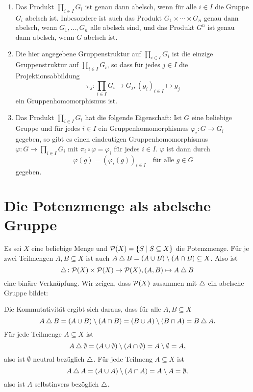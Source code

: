 \begin{bem}
 \begin{enumerate}[leftmargin=*]
  \item
   Das Produkt $\prod_{i \in I} G_i$ ist genau dann abelsch, wenn für alle $i \in I$ die Gruppe $G_i$ abelsch ist. Inbesondere ist auch das Produkt $G_1 \times \dotsb \times G_n$ genau dann abelsch, wenn $G_1, \dotsc, G_n$ alle abelsch sind, und das Produkt $G^n$ ist genau dann abelsch, wenn $G$ abelsch ist.
  \item
   Die hier angegebene Gruppenstruktur auf $\prod_{i \in I} G_i$ ist die einzige Gruppenstruktur auf $\prod_{i \in I} G_i$, so dass für jedes $j \in I$ die Projektionsabbildung
   \[
    \pi_j \colon \prod_{i \in I} G_i \to G_j, (g_i)_{i \in I} \mapsto g_j
   \]
   ein Gruppenhomomorphismus ist.
  \item
   Das Produkt $\prod_{i \in I} G_i$ hat die folgende Eigenschaft: Ist $G$ eine beliebige Gruppe und für jedes $i \in I$ ein Gruppenhomomorphismus $\varphi_i \colon G \to G_i$ gegeben, so gibt es einen eindeutigen Gruppenhomomorphismus $\varphi \colon G \to \prod_{i \in I} G_i$ mit $\pi_i \circ \varphi = \varphi_i$ für jedes $i \in I$. $\varphi$ ist dann durch
   \[
    \varphi(g) = (\varphi_i(g))_{i \in I}
    \quad
    \text{für alle $g \in G$}
   \]
   gegeben.
 \end{enumerate}
\end{bem}





\section{Die Potenzmenge als abelsche Gruppe}
Es sei $X$ eine beliebige Menge und $\mathcal{P}(X) = \{S \mid S \subseteq X\}$ die Potenzmenge. Für je zwei Teilmengen $A, B \subseteq X$ ist auch $A \bigtriangleup B = (A \cup B) \setminus (A \cap B) \subseteq X$. Also ist
\[
 \bigtriangleup \colon \mathcal{P}(X) \times \mathcal{P}(X) \to \mathcal{P}(X),
 (A,B) \mapsto A \bigtriangleup B
\]
eine binäre Verknüpfung. Wir zeigen, dass $\mathcal{P}(X)$ zusammen mit $\bigtriangleup$ ein abelsche Gruppe bildet:

Die Kommutativität ergibt sich daraus, dass für alle $A, B \subseteq X$
\[
 A \bigtriangleup B
 = (A \cup B) \setminus (A \cap B)
 = (B \cup A) \setminus (B \cap A)
 = B \bigtriangleup A.
\]
Für jede Teilmenge $A \subseteq X$ ist
\[
 A \bigtriangleup \emptyset
 = (A \cup \emptyset) \setminus (A \cap \emptyset)
 = A \setminus \emptyset
 = A,
\]
also ist $\emptyset$ neutral bezüglich $\bigtriangleup$. Für jede Teilmeng $A \subseteq X$ ist
\[
 A \bigtriangleup A
 = (A \cup A) \setminus (A \cap A)
 = A \setminus A
 = \emptyset,
\]
also ist $A$ selbstinvers bezöglich $\bigtriangleup$.

